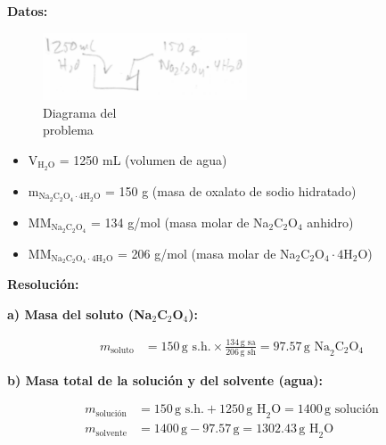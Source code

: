 \documentclass{article}
\begin{document}
\begin{multicols}{2} %

\noindent\textbf{Datos:} %
\begin{figure}[H]
    \begin{minipage}[t]{0.3\textwidth} %
        \raggedright %
        \includegraphics[width=\linewidth, height=2cm]{./problema6_diagrama.png} %
        \caption{Diagrama del \\ problema}
    \end{minipage}
\end{figure}
\begin{itemize}
\item V$_{\text{H}_2\text{O}}$ = 1250 mL (volumen de agua)
\item m$_{\text{Na}_2\text{C}_2\text{O}_4\cdot4\text{H}_2\text{O}}$ = 150 g (masa de oxalato de sodio hidratado)
\item MM$_{\text{Na}_2\text{C}_2\text{O}_4}$ = 134 g/mol (masa molar de Na$_2$C$_2$O$_4$ anhidro)
\item MM$_{\text{Na}_2\text{C}_2\text{O}_4\cdot4\text{H}_2\text{O}}$ = 206 g/mol (masa molar de Na$_2$C$_2$O$_4\cdot4\text{H}_2\text{O} $)
\end{itemize}

\columnbreak %

\noindent\textbf{Resolución:} %

\textbf{a) Masa del soluto (Na$_2$C$_2$O$_4$):}

\begin{align*}
    m_{\text{soluto}} &= 150 \, \text{g s.h.} \times \frac{134 \, \text{g sa}}{206 \, \text{g sh}} = 97.57 \, \text{g Na}_2\text{C}_2\text{O}_4
\end{align*}

\textbf{b) Masa total de la solución y del solvente (agua):}

\begin{align*}
    m_{\text{solución}} &= 150 \, \text{g s.h.} + 1250 \, \text{g H}_2\text{O} = 1400 \, \text{g solución} \\[10pt]
    m_{\text{solvente}} &= 1400 \, \text{g} - 97.57 \, \text{g} = 1302.43 \, \text{g H}_2\text{O}
\end{align*}


\end{multicols}
\end{document}
